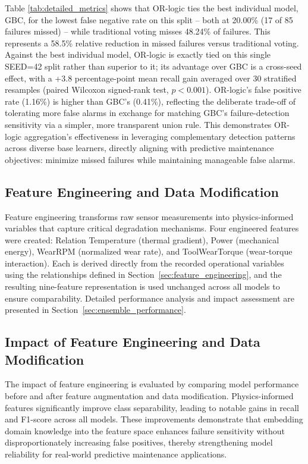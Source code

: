 \documentclass[final,5p, twocolumn]{elsarticle}
\begin{document}
Table \ref{tab:detailed_metrics} shows that OR-logic ties the best individual model, GBC, for the lowest false negative rate on this split -- both at 20.00\% (17 of 85 failures missed) -- while traditional voting misses 48.24\% of failures. This represents a 58.5\% relative reduction in missed failures versus traditional voting. Against the best individual model, OR-logic is exactly tied on this single SEED=42 split rather than superior to it; its advantage over GBC is a cross-seed effect, with a +3.8 percentage-point mean recall gain averaged over 30 stratified resamples (paired Wilcoxon signed-rank test, $p<0.001$). OR-logic's false positive rate (1.16\%) is higher than GBC's (0.41\%), reflecting the deliberate trade-off of tolerating more false alarms in exchange for matching GBC's failure-detection sensitivity via a simpler, more transparent union rule. This demonstrates OR-logic aggregation's effectiveness in leveraging complementary detection patterns across diverse base learners, directly aligning with predictive maintenance objectives: minimize missed failures while maintaining manageable false alarms.

\subsection{Feature Engineering and Data Modification}
Feature engineering transforms raw sensor measurements into physics-informed variables that capture critical degradation mechanisms. Four engineered features were created: Relation Temperature (thermal gradient), Power (mechanical energy), WearRPM (normalized wear rate), and ToolWearTorque (wear-torque interaction). Each is derived directly from the recorded operational variables using the relationships defined in Section~\ref{sec:feature_engineering}, and the resulting nine-feature representation is used unchanged across all models to ensure comparability. Detailed performance analysis and impact assessment are presented in Section~\ref{sec:ensemble_performance}.

\subsection{Impact of Feature Engineering and Data Modification}

The impact of feature engineering is evaluated by comparing model performance before and after feature augmentation and data modification. Physics-informed features significantly improve class separability, leading to notable gains in recall and F1-score across all models. These improvements demonstrate that embedding domain knowledge into the feature space enhances failure sensitivity without disproportionately increasing false positives, thereby strengthening model reliability for real-world predictive maintenance applications.
\end{document}
